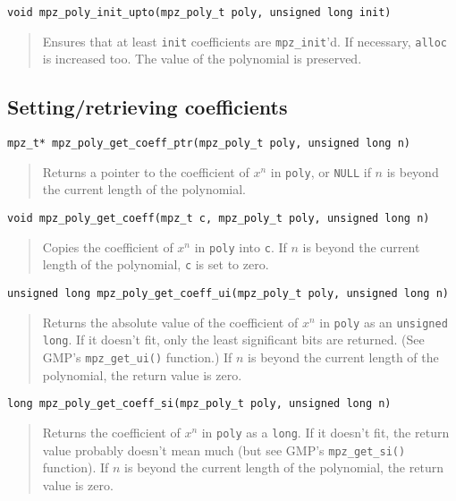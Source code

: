 \documentclass[a4paper,10pt]{article}
\newcommand{\code}{\lstinline}
\begin{document}
\begin{lstlisting}
void mpz_poly_init_upto(mpz_poly_t poly, unsigned long init)
\end{lstlisting}
\begin{quote}
Ensures that at least \code{init} coefficients are \code{mpz_init}'d. If necessary, \code{alloc} is increased too. The value of the polynomial is preserved.
\end{quote}



\subsection{Setting/retrieving coefficients}

\begin{lstlisting}
mpz_t* mpz_poly_get_coeff_ptr(mpz_poly_t poly, unsigned long n)
\end{lstlisting}
\begin{quote}
Returns a pointer to the coefficient of $x^n$ in \code{poly}, or \code{NULL} if $n$ is beyond the current length of the polynomial.
\end{quote}


\begin{lstlisting}
void mpz_poly_get_coeff(mpz_t c, mpz_poly_t poly, unsigned long n)
\end{lstlisting}
\begin{quote}
Copies the coefficient of $x^n$ in \code{poly} into \code{c}. If $n$ is beyond the current length of the polynomial, \code{c} is set to zero.
\end{quote}


\begin{lstlisting}
unsigned long mpz_poly_get_coeff_ui(mpz_poly_t poly, unsigned long n)
\end{lstlisting}
\begin{quote}
Returns the absolute value of the coefficient of $x^n$ in \code{poly} as an \code{unsigned long}. If it doesn't fit, only the least significant bits are returned. (See GMP's \code{mpz_get_ui()} function.) If $n$ is beyond the current length of the polynomial, the return value is zero.
\end{quote}


\begin{lstlisting}
long mpz_poly_get_coeff_si(mpz_poly_t poly, unsigned long n)
\end{lstlisting}
\begin{quote}
Returns the coefficient of $x^n$ in \code{poly} as a \code{long}. If it doesn't fit, the return value probably doesn't mean much (but see GMP's \code{mpz_get_si()} function). If $n$ is beyond the current length of the polynomial, the return value is zero.
\end{quote}
\end{document}
